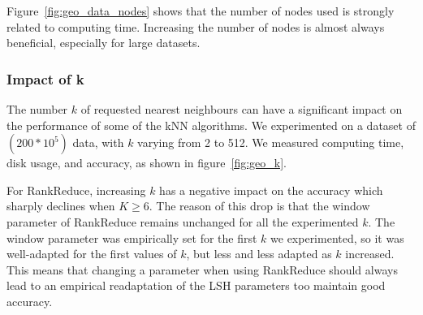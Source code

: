 Figure~\ref{fig:geo_data_nodes} shows that the number of nodes used is strongly related to computing time. Increasing the 
number of nodes is almost always beneficial, especially for large datasets. 



        
        
\subsubsection{Impact of k}
The number $k$ of requested nearest neighbours can have a significant impact on the performance of some of the kNN 
algorithms. We experimented on a dataset of $(200*10^{5})$  data, with  $k$ varying from 2 to 512. We measured computing time, disk usage, and accuracy, as shown in figure~\ref{fig:geo_k}.


For RankReduce, increasing $k$ has a negative impact on the accuracy which sharply declines when $K\geq 6$. The reason of 
this drop is that the window parameter of RankReduce remains unchanged for all the experimented $k$. The window parameter 
was empirically set for the first $k$ we experimented, so it was well-adapted for the first values of $k$, but less and 
less adapted as $k$ increased. This means that changing a parameter when using RankReduce should always lead to an 
empirical readaptation of the LSH parameters too maintain good accuracy. 
  
